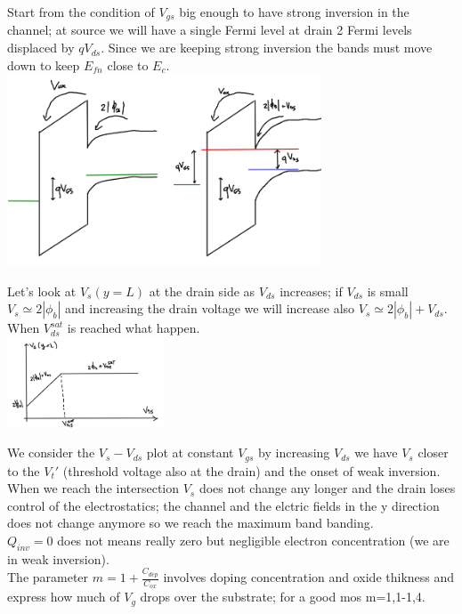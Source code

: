 Start from the condition of $V_{gs}$ big enough to have strong inversion in the channel; at source we will have a single Fermi level at drain 2 Fermi levels displaced by $qV_{ds}$. Since we are keeping strong inversion the bands must move down to keep $E_{fn}$ close to $E_c$.\\

\centering
\includegraphics[width=0.7\textwidth]{f2.png}\\
\raggedright


Let's look at $V_s(y=L)$ at the drain side as $V_{ds}$ increases; if $V_{ds}$ is small $V_s\simeq 2|\phi_b|$ and increasing the drain voltage we will increase also $V_s\simeq 2|\phi_b|+V_{ds}$. When $V_{ds}^{sat}$ is reached what happen.\\


\centering
\includegraphics[width=0.35\textwidth]{f3.png}\\
\raggedright


We consider the $V_s-V_{ds}$ plot at constant $V_{gs}$ by increasing $V_{ds}$ we have $V_s$ closer to the $V_t'$ (threshold voltage also at the drain) and the onset of weak inversion. When we reach the intersection $V_s$ does not change any longer and the drain loses control of the electrostatics; the channel and the elctric fields in the y direction does not change anymore so we reach the maximum band banding.\\ $Q_{inv}=0$ does not means really zero but negligible electron concentration (we are in weak inversion).\\
The parameter $m=1+\frac{C_{dep}}{C_{ox}}$ involves doping concentration and oxide thikness and express how much of $V_g$ drops over the substrate; for a good mos m=1,1-1,4.\\



